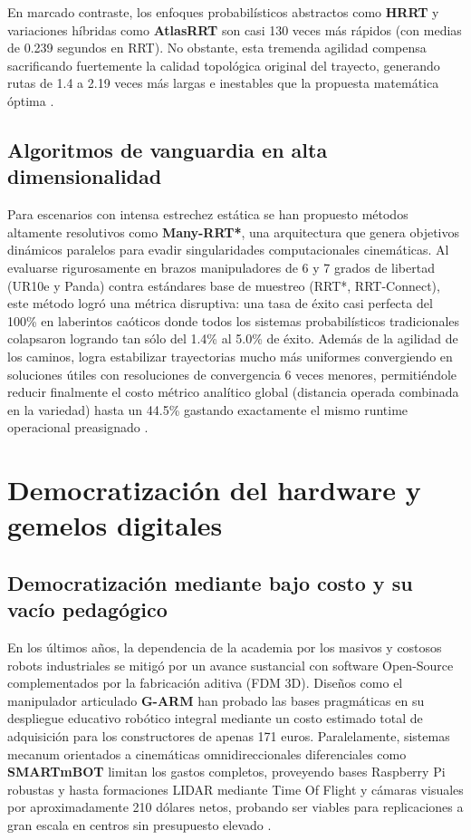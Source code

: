 En marcado contraste, los enfoques probabilísticos abstractos como \textbf{HRRT} y 
variaciones híbridas como \textbf{AtlasRRT} son casi 130 veces más rápidos (con medias 
de 0.239 segundos en RRT). No obstante, esta tremenda agilidad compensa sacrificando 
fuertemente la calidad topológica original del trayecto, generando rutas de 1.4 a 
2.19 veces más largas e inestables que la propuesta matemática óptima 
\parencite{Bhattacharya2012Topological, radhakrishnan2024state}.

\subsection{Algoritmos de vanguardia en alta dimensionalidad}
Para escenarios con intensa estrechez estática se han propuesto métodos altamente 
resolutivos como \textbf{Many-RRT*}, una arquitectura que genera objetivos dinámicos 
paralelos para evadir singularidades computacionales cinemáticas. Al evaluarse 
rigurosamente en brazos manipuladores de 6 y 7 grados de libertad (UR10e y Panda) 
contra estándares base de muestreo (RRT*, RRT-Connect), este método logró una 
métrica disruptiva: una tasa de éxito casi perfecta del 100\% en laberintos 
caóticos donde todos los sistemas probabilísticos tradicionales colapsaron 
logrando tan sólo del 1.4\% al 5.0\% de éxito. Además de la agilidad de los 
caminos, logra estabilizar trayectorias mucho más uniformes convergiendo en 
soluciones útiles con resoluciones de convergencia 6 veces menores, permitiéndole 
reducir finalmente el costo métrico analítico global (distancia operada combinada 
en la variedad) hasta un 44.5\% gastando exactamente el mismo runtime operacional 
preasignado \parencite{belmont2026many}.

\section{Democratización del hardware y gemelos digitales}

\subsection{Democratización mediante bajo costo y su vacío pedagógico}
En los últimos años, la dependencia de la academia por los masivos y costosos 
robots industriales se mitigó por un avance sustancial con software Open-Source 
complementados por la fabricación aditiva (FDM 3D). Diseños como el manipulador 
articulado \textbf{G-ARM} han probado las bases pragmáticas en su despliegue 
educativo robótico integral mediante un costo estimado total de adquisición para 
los constructores de apenas 171 euros. Paralelamente, sistemas mecanum orientados a 
cinemáticas omnidireccionales diferenciales como \textbf{SMARTmBOT} limitan los gastos 
completos, proveyendo bases Raspberry Pi robustas y hasta formaciones LIDAR mediante 
Time Of Flight y cámaras visuales por aproximadamente 210 dólares netos, probando ser 
viables para replicaciones a gran escala en centros sin presupuesto elevado 
\parencite{vega2025g, jo2022smartmbot}.

